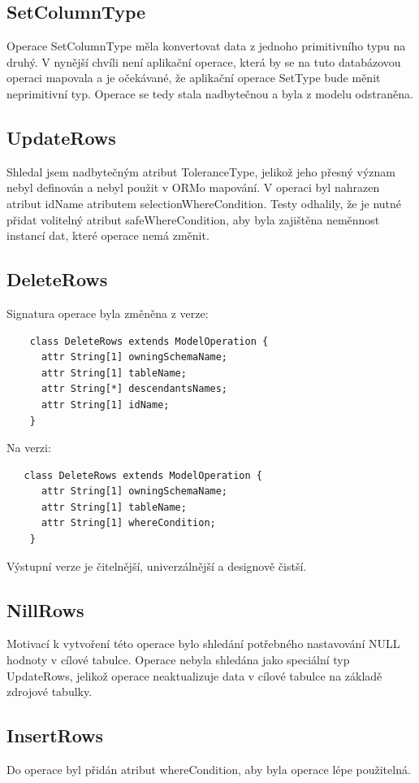 \documentclass[11pt,twoside,a4paper]{book}
\begin{document}
\subsection{SetColumnType}
Operace SetColumnType měla konvertovat data z jednoho primitivního typu na
druhý. V nynější chvíli není aplikační operace, která by se na tuto databázovou
operaci mapovala a je očekávané, že aplikační operace SetType bude měnit
neprimitivní typ. Operace se tedy stala nadbytečnou a byla z modelu odstraněna.


\subsection{UpdateRows}
Shledal jsem nadbytečným atribut ToleranceType, jelikož jeho přesný význam nebyl
definován a nebyl použit v ORMo mapování. V operaci byl nahrazen atribut idName
atributem selectionWhereCondition. Testy odhalily, že je nutné přidat volitelný
atribut safeWhereCondition, aby byla zajištěna neměnnost instancí dat, které
operace nemá změnit.

\subsection{DeleteRows}
Signatura operace byla změněna z verze:
\begin{verbatim}
    class DeleteRows extends ModelOperation {
      attr String[1] owningSchemaName;
      attr String[1] tableName;
      attr String[*] descendantsNames;
      attr String[1] idName;
    }
\end{verbatim}
Na verzi:
\begin{verbatim}
   class DeleteRows extends ModelOperation {
      attr String[1] owningSchemaName;
      attr String[1] tableName;
      attr String[1] whereCondition;
    }
\end{verbatim}  
Výstupní verze je čitelnější, univerzálnější a designově čistší.

\subsection{NillRows}
Motivací k vytvoření této operace bylo shledání potřebného nastavování
NULL hodnoty v cílové tabulce. Operace nebyla shledána jako speciální typ
UpdateRows, jelikož operace neaktualizuje data v cílové tabulce na základě
zdrojové tabulky.

\subsection{InsertRows}
Do operace byl přidán atribut whereCondition, aby byla operace lépe použitelná.
\end{document}
